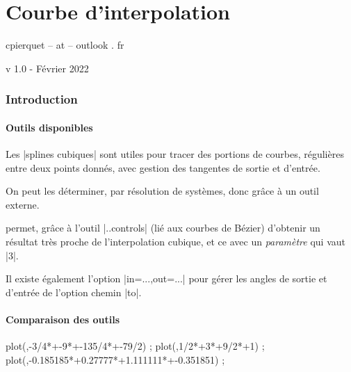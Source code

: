 \documentclass{article}
\begin{document}
\newcommand\listecoeffs[4]{%
	\draw (0,5.5) node[left,Aquamarine,font=\small\ttfamily] {Coeffs} ;
	\node[coeffs] at (2,5.5) {#1} ;
	\node[coeffs] at ({(4+7.5)/2},5.5) {#2} ;
	\node[coeffs] at ({(7.5+9)/2},5.5) {#3} ;
	\node[coeffs] at ({(9+10)/2},5.5) {#4} ;%
}

\part*{Courbe d'interpolation}

\begin{center}
	\textsf{cpierquet -- at -- outlook . fr}
	
	\textsf{v 1.0 - Février 2022}
\end{center}

\section{Introduction}

\subsection{Outils disponibles}

Les \rverb|splines cubiques| sont utiles pour \og tracer \fg{} des portions de courbes, régulières entre deux points donnés, avec gestion des tangentes de sortie et d'entrée.

On peut les déterminer, par résolution de systèmes, donc grâce à un outil externe.

\smallskip

\TikZ{} permet, grâce à l'outil \overb|..controls| (lié aux courbes de Bézier) d'obtenir un résultat très proche de l'interpolation cubique, et ce avec un \textit{paramètre} qui vaut \overb|3|.

\smallskip

Il existe également l'option \vverb|in=...,out=...| pour gérer les angles de sortie et d'entrée de l'option chemin \vverb|to|.


\subsection{Comparaison des outils}

{\scriptsize \begin{codehigh}[language=latex/latex2,style/main=red!25,style/code=red!25]
\draw[red,domain=-5:-3] plot(\x,{-3/4*\x*\x*\x+-9*\x*\x+-135/4*\x+-79/2}) ;
\draw[red,domain=-3:-1] plot(\x,{1/2*\x*\x*\x+3*\x*\x+9/2*\x+1}) ;
\draw[red,domain=-1:2] plot(\x,{-0.185185*\x*\x*\x+0.27777*\x*\x+1.111111*\x+-0.351851}) ;
\end{codehigh}}
\end{document}
